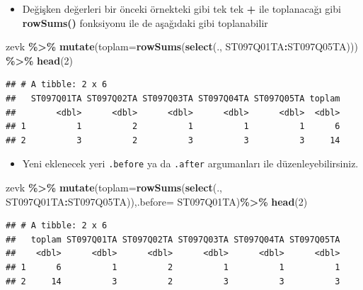 \documentclass[
  oneside]{book}
\newenvironment{Shaded}{\begin{snugshade}}{\end{snugshade}}
\newcommand{\AttributeTok}[1]{\textcolor[rgb]{0.13,0.29,0.53}{#1}}
\newcommand{\DecValTok}[1]{\textcolor[rgb]{0.00,0.00,0.81}{#1}}
\newcommand{\FunctionTok}[1]{\textcolor[rgb]{0.13,0.29,0.53}{\textbf{#1}}}
\newcommand{\NormalTok}[1]{#1}
\newcommand{\SpecialCharTok}[1]{\textcolor[rgb]{0.81,0.36,0.00}{\textbf{#1}}}
\providecommand{\tightlist}{%
  \setlength{\itemsep}{0pt}\setlength{\parskip}{0pt}}
\begin{document}
\begin{itemize}
\tightlist
\item
  Değişken değerleri bir önceki örnekteki gibi tek tek \textbf{+} ile toplanacağı gibi \textbf{rowSums()} fonksiyonu ile de aşağıdaki gibi toplanabilir
\end{itemize}

\begin{Shaded}
\begin{Highlighting}[]
\NormalTok{zevk }\SpecialCharTok{\%\textgreater{}\%}
\FunctionTok{mutate}\NormalTok{(}\AttributeTok{toplam=}\FunctionTok{rowSums}\NormalTok{(}\FunctionTok{select}\NormalTok{(., ST097Q01TA}\SpecialCharTok{:}\NormalTok{ST097Q05TA))) }\SpecialCharTok{\%\textgreater{}\%}
\FunctionTok{head}\NormalTok{(}\DecValTok{2}\NormalTok{)}
\end{Highlighting}
\end{Shaded}

\begin{verbatim}
## # A tibble: 2 x 6
##   ST097Q01TA ST097Q02TA ST097Q03TA ST097Q04TA ST097Q05TA toplam
##        <dbl>      <dbl>      <dbl>      <dbl>      <dbl>  <dbl>
## 1          1          2          1          1          1      6
## 2          3          2          3          3          3     14
\end{verbatim}

\begin{itemize}
\tightlist
\item
  Yeni eklenecek yeri \texttt{.before} ya da \texttt{.after} argumanları ile düzenleyebilirsiniz.
\end{itemize}

\begin{Shaded}
\begin{Highlighting}[]
\NormalTok{zevk }\SpecialCharTok{\%\textgreater{}\%}
\FunctionTok{mutate}\NormalTok{(}\AttributeTok{toplam=}\FunctionTok{rowSums}\NormalTok{(}\FunctionTok{select}\NormalTok{(., ST097Q01TA}\SpecialCharTok{:}\NormalTok{ST097Q05TA)),}\AttributeTok{.before=}\NormalTok{ ST097Q01TA)}\SpecialCharTok{\%\textgreater{}\%} \FunctionTok{head}\NormalTok{(}\DecValTok{2}\NormalTok{)}
\end{Highlighting}
\end{Shaded}

\begin{verbatim}
## # A tibble: 2 x 6
##   toplam ST097Q01TA ST097Q02TA ST097Q03TA ST097Q04TA ST097Q05TA
##    <dbl>      <dbl>      <dbl>      <dbl>      <dbl>      <dbl>
## 1      6          1          2          1          1          1
## 2     14          3          2          3          3          3
\end{verbatim}
\end{document}
